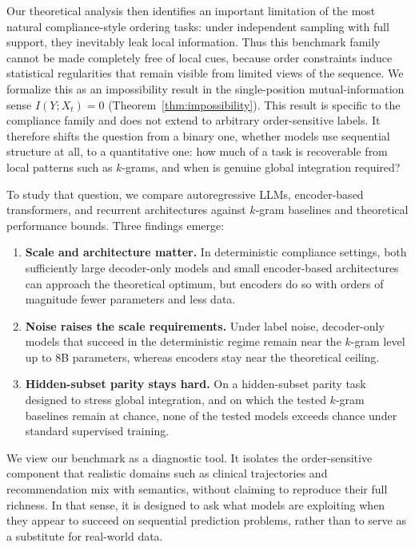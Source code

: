 \documentclass{article}
\theoremstyle{plain}
\theoremstyle{definition}
\theoremstyle{remark}
\begin{document}
Our theoretical analysis then identifies an important limitation of the most natural compliance-style ordering tasks: under independent sampling with full support, they inevitably leak local information. Thus this benchmark family cannot be made completely free of local cues, because order constraints induce statistical regularities that remain visible from limited views of the sequence. We formalize this as an impossibility result in the single-position mutual-information sense $I(Y;X_t)=0$ (Theorem~\ref{thm:impossibility}). This result is specific to the compliance family and does not extend to arbitrary order-sensitive labels. It therefore shifts the question from a binary one, whether models use sequential structure at all, to a quantitative one: how much of a task is recoverable from local patterns such as $k$-grams, and when is genuine global integration required?

To study that question, we compare autoregressive LLMs, encoder-based transformers, and recurrent architectures against $k$-gram baselines and theoretical performance bounds. Three findings emerge:
\begin{enumerate}
    \item \textbf{Scale and architecture matter.} In deterministic compliance settings, both sufficiently large decoder-only models and small encoder-based architectures can approach the theoretical optimum, but encoders do so with orders of magnitude fewer parameters and less data.
    \item \textbf{Noise raises the scale requirements.} Under label noise, decoder-only models that succeed in the deterministic regime remain near the $k$-gram level up to 8B parameters, whereas encoders stay near the theoretical ceiling.
    \item \textbf{Hidden-subset parity stays hard.} On a hidden-subset parity task designed to stress global integration, and on which the tested $k$-gram baselines remain at chance, none of the tested models exceeds chance under standard supervised training.
\end{enumerate}

We view our benchmark as a diagnostic tool. It isolates the order-sensitive component that realistic domains such as clinical trajectories and recommendation mix with semantics, without claiming to reproduce their full richness. In that sense, it is designed to ask what models are exploiting when they appear to succeed on sequential prediction problems, rather than to serve as a substitute for real-world data.
\end{document}
